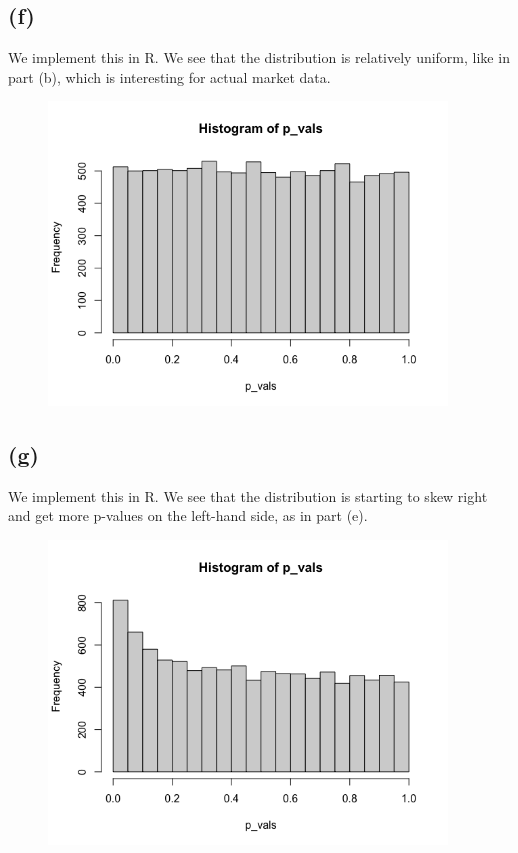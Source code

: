 \documentclass{article}
\begin{document}
{\subsection*{(f)}

We implement this in R. We see that the distribution is relatively uniform, like in part (b), which is interesting for actual market data.
\begin{figure}[h!]
  \centering
  \includegraphics[width=300pt]{hw7_2f.png}
\end{figure}

\subsection*{(g)}

We implement this in R. We see that the distribution is starting to skew right and get more p-values on the left-hand side, as in part (e).
\begin{figure}[h!]
  \centering
  \includegraphics[width=300pt]{hw7_2g.png}
\end{figure}

}
\end{document}
